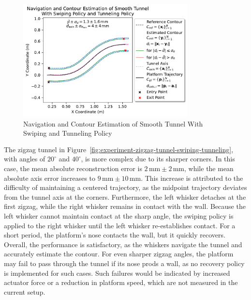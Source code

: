 \begin{figure}[!htb]
    \centering
    \includegraphics[width=0.8\textwidth]{figures/experiments/smooth-tunnel-swiping-tunneling}
    \caption{Navigation and Contour Estimation of Smooth Tunnel With Swiping and Tunneling Policy}
    \label{fig:experiment-smooth-tunnel-swiping-tunneling}
\end{figure}

The zigzag tunnel in Figure~\ref{fig:experiment-zigzag-tunnel-swiping-tunneling}, with angles of $20^\circ$ and $40^\circ$, is more complex due to its sharper corners.
In this case, the mean absolute reconstruction error is $2\,\text{mm} \pm 2\,\text{mm}$, while the mean absolute axis error increases to $9\,\text{mm} \pm 10\,\text{mm}$.
This increase is attributed to the difficulty of maintaining a centered trajectory, as the midpoint trajectory deviates from the tunnel axis at the corners.
Furthermore, the left whisker detaches at the first zigzag, while the right whisker remains in contact with the wall.
Because the left whisker cannot maintain contact at the sharp angle, the swiping policy is applied to the right whisker until the left whisker re-establishes contact.
For a short period, the platform's nose contacts the wall, but it quickly recovers.
Overall, the performance is satisfactory, as the whiskers navigate the tunnel and accurately estimate the contour.
For even sharper zigzag angles, the platform may fail to pass through the tunnel if its nose prods a wall, as no recovery policy is implemented for such cases.
Such failures would be indicated by increased actuator force or a reduction in platform speed, which are not measured in the current setup.

